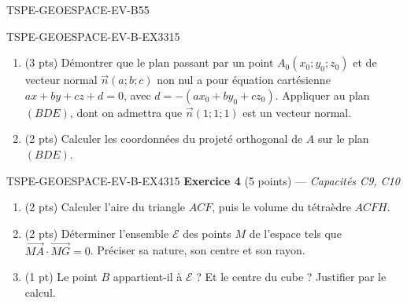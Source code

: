 \begin{evaluation}{TSPE-GEOESPACE-EV-B}{55}
\begin{exercice}{TSPE-GEOESPACE-EV-B-EX3}{3}{15}
\medskip

\begin{enumerate}
  \item (3 pts) Démontrer que le plan passant par un point $A_0(x_0;y_0;z_0)$ et de
        vecteur normal $\vec{n}(a;b;c)$ non nul a pour équation cartésienne
        $ax+by+cz+d=0$, avec $d=-(ax_0+by_0+cz_0)$. Appliquer au plan $(BDE)$,
        dont on admettra que $\vec{n}(1;1;1)$ est un vecteur normal.
  \item (2 pts) Calculer les coordonnées du projeté orthogonal de $A$ sur le plan
        $(BDE)$.
\end{enumerate}
\end{exercice}

\begin{exercice}{TSPE-GEOESPACE-EV-B-EX4}{3}{15}
\textbf{Exercice 4} (5 points) — \textit{Capacités C9, C10}

\medskip

\begin{enumerate}
  \item (2 pts) Calculer l'aire du triangle $ACF$, puis le volume du tétraèdre
        $ACFH$.
  \item (2 pts) Déterminer l'ensemble $\mathcal{E}$ des points $M$ de l'espace tels
        que $\vec{MA}\cdot\vec{MG}=0$. Préciser sa nature, son centre et son rayon.
  \item (1 pt) Le point $B$ appartient-il à $\mathcal{E}$ ? Et le centre du cube ?
        Justifier par le calcul.
\end{enumerate}
\end{exercice}

\end{evaluation}
